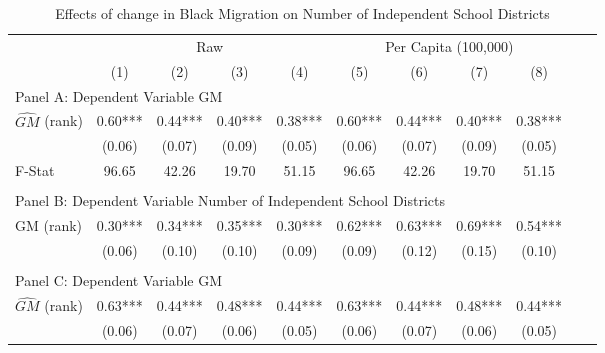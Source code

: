  \begin{table}[htbp]\centering {} \begin{threeparttable} \caption{Effects of change in Black Migration on Number of Independent School Districts} \begin{tabular}{l*{10}{c}} \toprule
                &\multicolumn{4}{c}{Raw}                                    &\multicolumn{4}{c}{Per Capita (100,000)}                   \\\cmidrule(lr){2-5}\cmidrule(lr){6-9}
                &\multicolumn{1}{c}{(1)}   &\multicolumn{1}{c}{(2)}   &\multicolumn{1}{c}{(3)}   &\multicolumn{1}{c}{(4)}   &\multicolumn{1}{c}{(5)}   &\multicolumn{1}{c}{(6)}   &\multicolumn{1}{c}{(7)}   &\multicolumn{1}{c}{(8)}   \\
\cmidrule(lr){1-9}
\multicolumn{8}{l}{Panel A: Dependent Variable GM}\\
\cmidrule(lr){1-9}
$\hat{GM}$ (rank)&       0.60***&       0.44***&       0.40***&       0.38***&       0.60***&       0.44***&       0.40***&       0.38***\\
                &     (0.06)   &     (0.07)   &     (0.09)   &     (0.05)   &     (0.06)   &     (0.07)   &     (0.09)   &     (0.05)   \\
\midrule
F-Stat          &      96.65   &      42.26   &      19.70   &      51.15   &      96.65   &      42.26   &      19.70   &      51.15   \\
\cmidrule[\heavyrulewidth](lr){1-9} \\ \cmidrule[\heavyrulewidth](lr){1-9}
\multicolumn{8}{l}{Panel B: Dependent Variable Number of Independent School Districts}\\
\cmidrule(lr){1-9}
GM  (rank)      &       0.30***&       0.34***&       0.35***&       0.30***&       0.62***&       0.63***&       0.69***&       0.54***\\
                &     (0.06)   &     (0.10)   &     (0.10)   &     (0.09)   &     (0.09)   &     (0.12)   &     (0.15)   &     (0.10)   \\
\cmidrule[\heavyrulewidth](lr){1-9} \\ \cmidrule[\heavyrulewidth](lr){1-9}
\multicolumn{8}{l}{Panel C: Dependent Variable GM}\\
\cmidrule(lr){1-9}
$\hat{GM}$ (rank)&       0.63***&       0.44***&       0.48***&       0.44***&       0.63***&       0.44***&       0.48***&       0.44***\\
                &     (0.06)   &     (0.07)   &     (0.06)   &     (0.05)   &     (0.06)   &     (0.07)   &     (0.06)   &     (0.05)   \\

\end{tabular}
\end{threeparttable}
\end{table}
